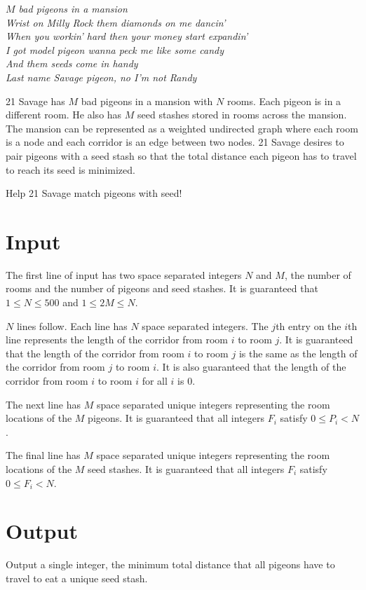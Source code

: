 
\begin{center}
\textit{
$M$ bad pigeons in a mansion \\
Wrist on Milly Rock them diamonds on me dancin' \\
When you workin' hard then your money start expandin' \\
I got model pigeon wanna peck me like some candy \\
And them seeds come in handy \\
Last name Savage pigeon, no I'm not Randy \\
}
\end{center}

21 Savage has $M$ bad pigeons in a mansion with $N$ rooms. Each pigeon
is in a different room. He also has $M$ seed stashes stored in rooms across
the mansion. The mansion can be represented as a weighted undirected graph
where each room is a node and each corridor is an edge between two nodes. 21
Savage desires to pair pigeons with a seed stash so that the total distance
each pigeon has to travel to reach its seed is minimized.

\medskip

Help 21 Savage match pigeons with seed!

\section*{Input}

The first line of input has two space separated integers $N$ and $M$, the
number of rooms and the number of pigeons and seed stashes. It is guaranteed
that $1 \le N \le 500$ and $1 \le 2M \le N$.

$N$ lines follow. Each line has $N$ space separated integers. The $j$th entry
on the $i$th line represents the length of the corridor from room $i$ to room
$j$. It is guaranteed that the length of the corridor from room $i$ to room
$j$ is the same as the length of the corridor from room $j$ to room $i$. It
is also guaranteed that the length of the corridor from room $i$ to room $i$
for all $i$ is $0$.

The next line has $M$ space separated unique integers representing the room
locations of the $M$ pigeons. It is guaranteed that all integers $F_i$ satisfy
$0 \le P_i < N$.

The final line has $M$ space separated unique integers representing the room
locations of the $M$ seed stashes. It is guaranteed that all integers $F_i$ satisfy
$0 \le F_i < N$.

\section*{Output}

Output a single integer, the minimum total distance that all pigeons have to
travel to eat a unique seed stash.

